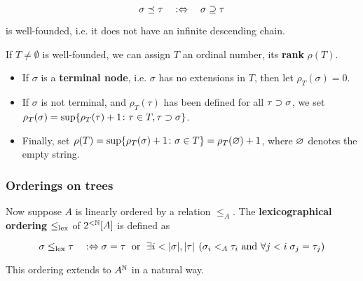 \begin{equation}
\sigma \preceq \tau \quad :\Leftrightarrow \quad \sigma \supseteq \tau
\end{equation}

is well-founded, i.e. it does not have an infinite descending chain.

If $T \neq \emptyset$ is well-founded, we can assign $T$ an ordinal number, its \textbf{rank} $\rho(T)$.

\begin{itemize}
\item If $\sigma$ is a \textbf{terminal node}, i.e. $\sigma$ has no extensions in $T$, then let $\rho_T(\sigma) = 0$.


\item If $\sigma$ is not terminal, and $\rho_T(\tau)$ has been defined for all $\tau \supset \sigma$, we set $\rho_T(\sigma) = \sup \{\rho_T(\tau)+1 \colon \tau \in T, \tau \supset \sigma \}$.


\item Finally, set $\rho(T) = \sup\{\rho_T(\sigma) + 1 \colon \sigma\in T \} = \rho_T(\varnothing)+1$, where $\varnothing$ denotes the empty string.
\end{itemize}

\subsubsection{Orderings on trees}

Now suppose $A$ is linearly ordered by a relation $\leq_A$.
The \textbf{lexicographical ordering} $\leq_{\operatorname{lex}}$ of $2^{<\mathbb{N}}[A]$ is defined as

\begin{equation*}
\sigma \leq_{\lex} \tau \quad :\Leftrightarrow \quad \\
        \sigma = \tau \; \text{ or } \; \exists i <|\sigma|,|\tau| \: \left( \sigma_i <_A \tau_i \text{ and } \forall j < i \; \sigma_j = \tau_j  \right )
\end{equation*}

This ordering extends to $A^{\mathbb{N}}$ in a natural way.

